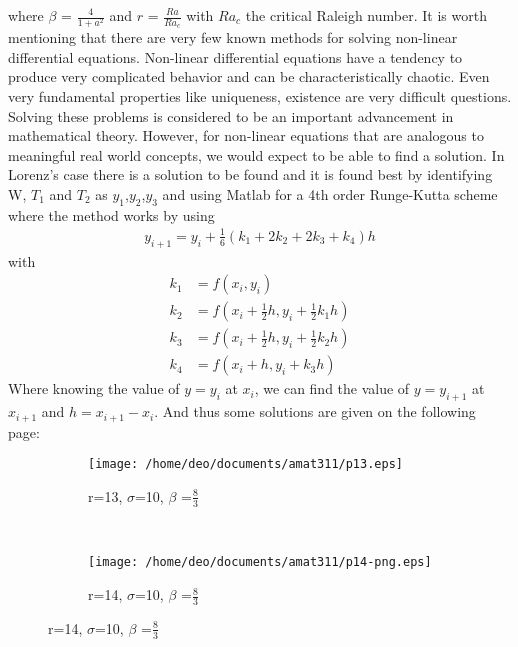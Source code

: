 \documentclass[letterpaper,titlepage,10pt]{article}
\begin{document}
{where $\beta$ = $\frac{4}{1+a^{2}} $ and $r$ = $\frac{Ra}{Ra_{c}}$ with $Ra_{c}$ the critical Raleigh number. \newline \newline
It is worth mentioning that there are very few known methods for solving non-linear differential equations. Non-linear differential equations have a tendency to produce very complicated behavior and can be characteristically chaotic. Even very fundamental properties like uniqueness, existence are very difficult questions. Solving these problems is considered to be an important advancement in mathematical theory. However, for non-linear equations that are analogous to meaningful real world concepts, we would expect to be able to find a solution. 
In Lorenz's case there is a solution to be found and it is found best by identifying W, $T_{1}$ and $T_{2}$ as $y_{1}$,$y_{2}$,$y_{3}$ and using Matlab for a 4th order Runge-Kutta scheme where the method works by using \cite{f}
\begin{align*}
y_{i+1} = y_{i} + \frac{1}{6}(k_{1}+2k_{2}+2k_{3}+k_{4})h
\end{align*}
with
\begin{align*}
k_{1} &= f(x_{i},y_{i}) \\
k_{2} &= f(x_{i}+ \frac{1}{2}h, y_{i}+ \frac{1}{2}k_{1}h) \\
k_{3} &= f(x_{i}+ \frac{1}{2}h, y_{i}+ \frac{1}{2}k_{2}h) \\
k_{4} &= f(x_{i}+ h, y_{i}+ k_{3}h)
\end{align*}
Where knowing the value of $y= y_{i}$ at $x_{i}$, we can find the value of $y=y_{i+1}$ at $x_{i+1}$ and $h=x_{i+1} - x_{i}$.  
And thus some solutions are given on the following page:
\newpage{}
\vfill 
\begin{figure}
        \centering
        \begin{subfigure}[H]{0.3\textwidth}
                \texttt{[image: /home/deo/documents/amat311/p13.eps]}
                \caption{r=13, $\sigma$=10, $\beta$ =$\frac{8}{3}$ }
                \label{fig:gull}
        \end{subfigure}%
      \quad
        ~ %
        \begin{subfigure}[H]{0.3\textwidth}
                \texttt{[image: /home/deo/documents/amat311/p14-png.eps]}
                \caption{r=14, $\sigma$=10, $\beta$ =$\frac{8}{3}$}
                \label{fig:tiger}

\end{subfigure}
\end{figure}}
\end{document}
